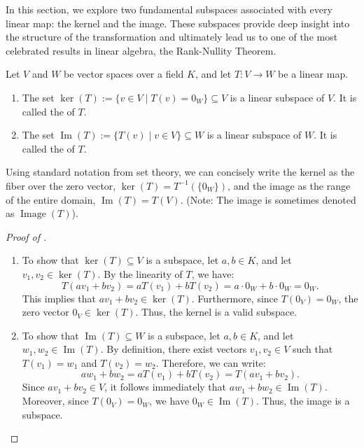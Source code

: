 In this section, we explore two fundamental subspaces associated with every linear map: the kernel and the image. These subspaces provide deep insight into the structure of the transformation and ultimately lead us to one of the most celebrated results in linear algebra, the Rank-Nullity Theorem.

\begin{proposition}
\label{prop:kernel_image}
Let $V$ and $W$ be vector spaces over a field $K$, and let $T: V \to W$ be a linear map.
\begin{enumerate}
    \item The set $\ker(T) := \{v \in V \mid T(v) = 0_W\} \subseteq V$ is a linear subspace of $V$. It is called the  of $T$.
    \item The set $\operatorname{Im}(T) := \{T(v) \mid v \in V\} \subseteq W$ is a linear subspace of $W$. It is called the  of $T$.
\end{enumerate}
\end{proposition}

\begin{remark}
\label{rem:set_theoretic_notation}
Using standard notation from set theory, we can concisely write the kernel as the fiber over the zero vector, $\ker(T) = T^{-1}(\{0_W\})$, and the image as the range of the entire domain, $\operatorname{Im}(T) = T(V)$. (Note: The image is sometimes denoted as $\operatorname{Image}(T)$).
\end{remark}

\begin{proof}[Proof of ]
\begin{enumerate}
    \item To show that $\ker(T) \subseteq V$ is a subspace, let $a, b \in K$, and let $v_1, v_2 \in \ker(T)$. By the linearity of $T$, we have:
    \[
    T(a v_1 + b v_2) = a T(v_1) + b T(v_2) = a \cdot 0_W + b \cdot 0_W = 0_W.
    \]
    This implies that $a v_1 + b v_2 \in \ker(T)$. Furthermore, since $T(0_V) = 0_W$, the zero vector $0_V \in \ker(T)$. Thus, the kernel is a valid subspace.
    
    \item To show that $\operatorname{Im}(T) \subseteq W$ is a subspace, let $a, b \in K$, and let $w_1, w_2 \in \operatorname{Im}(T)$. By definition, there exist vectors $v_1, v_2 \in V$ such that $T(v_1) = w_1$ and $T(v_2) = w_2$. Therefore, we can write:
    \[
    a w_1 + b w_2 = a T(v_1) + b T(v_2) = T(a v_1 + b v_2).
    \]
    Since $a v_1 + b v_2 \in V$, it follows immediately that $a w_1 + b w_2 \in \operatorname{Im}(T)$. Moreover, since $T(0_V) = 0_W$, we have $0_W \in \operatorname{Im}(T)$. Thus, the image is a subspace.
\end{enumerate}
\end{proof}

